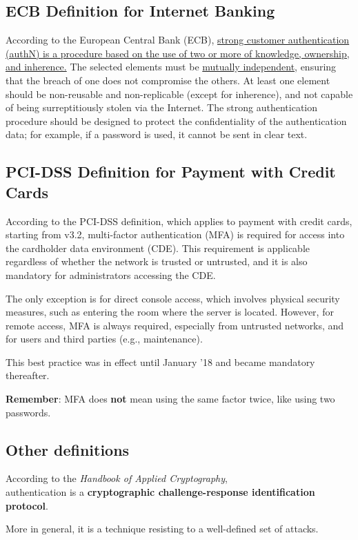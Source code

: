 \subsection{ECB Definition for Internet Banking}
According to the European Central Bank (ECB), \ul{strong customer authentication (authN) is a procedure based on the use of two or more of knowledge, ownership, and inherence.} The selected elements must be \ul{mutually independent}, ensuring that the breach of one does not compromise the others. At least one element should be non-reusable and non-replicable (except for inherence), and not capable of being surreptitiously stolen via the Internet. The strong authentication procedure should be designed to protect the confidentiality of the authentication data; for example, if a password is used, it cannot be sent in clear text.


\subsection{PCI-DSS Definition for Payment with Credit Cards}
According to the PCI-DSS definition, which applies to payment with credit cards, starting from v3.2, multi-factor authentication (MFA) is required for access into the cardholder data environment (CDE). This requirement is applicable regardless of whether the network is trusted or untrusted, and it is also mandatory for administrators accessing the CDE.

The only exception is for direct console access, which involves physical security measures, such as entering the room where the server is located. However, for remote access, MFA is always required, especially from untrusted networks, and for users and third parties (e.g., maintenance).

This best practice was in effect until January '18 and became mandatory thereafter.

\textbf{Remember}: MFA does \textbf{not} mean using the same factor twice, like using two passwords.



\subsection{Other definitions}
According to the \textit{Handbook of Applied Cryptography},\\
authentication is a \textbf{cryptographic challenge-response identification protocol}.

More in general, it is a technique resisting to a well-defined set of attacks.

